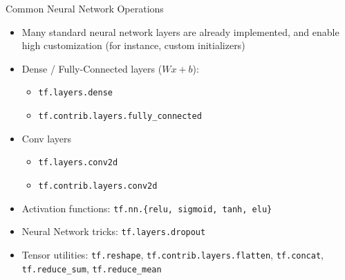 \documentclass[]{beamer}
\begin{document}
\begin{frame}[fragile]{Common Neural Network Operations}

\begin{itemize}
\item Many standard neural network layers are already implemented, and enable high customization (for instance, custom initializers)
\item Dense / Fully-Connected layers ($Wx + b$):
\begin{itemize}
\item \verb|tf.layers.dense|
\item \verb|tf.contrib.layers.fully_connected|
\end{itemize}
\item Conv layers
\begin{itemize}
\item \verb|tf.layers.conv2d|
\item \verb|tf.contrib.layers.conv2d|
\end{itemize}
\item Activation functions: \verb|tf.nn.{relu, sigmoid, tanh, elu}|
\item Neural Network tricks: \verb|tf.layers.dropout|
\item Tensor utilities: \verb|tf.reshape|, \verb|tf.contrib.layers.flatten|, \verb|tf.concat|, \verb|tf.reduce_sum|, \verb|tf.reduce_mean|
\end{itemize}

\end{frame}
\end{document}
